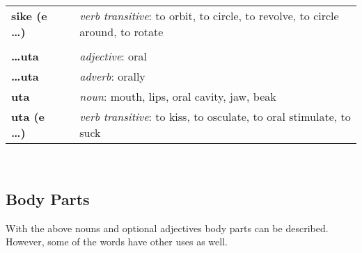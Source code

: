 \begin{supertabular}{p{2,5cm}|ll}
    \textbf{sike (e \dots)}   &  & \textit{verb transitive}: to orbit, to circle, to revolve, to circle around, to rotate      \\ %
                              &  &                                                                                             \\ %
    \textbf{\dots uta}        &  & \textit{adjective}: oral                                                                    \\ %
    \textbf{\dots uta}        &  & \textit{adverb}: orally                                                                     \\ %
    \textbf{uta}              &  & \textit{noun}: mouth, lips, oral cavity, jaw, beak                                          \\ %
    \textbf{uta (e \dots)}    &  & \textit{verb transitive}: to kiss, to osculate, to oral stimulate, to suck                  \\ %

\end{supertabular} \\
%
\newpage
%
\subsection*{Body Parts}
%
With the above nouns and optional adjectives body parts can be described.
However, some of the words have other uses as well.
%

